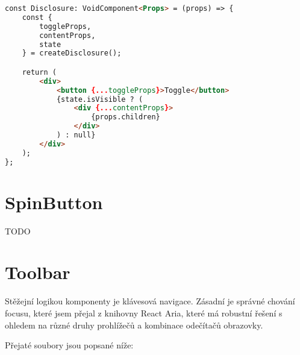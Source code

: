 \clearpage

\begin{lstlisting}[caption={Ukázka implementace Disclosure komponenty}, label={disclosure-example}, language=html]
const Disclosure: VoidComponent<Props> = (props) => {
    const {
        toggleProps,
        contentProps,
        state
    } = createDisclosure();

    return (
        <div>
            <button {...toggleProps}>Toggle</button>
            {state.isVisible ? (
                <div {...contentProps}>
                    {props.children}
                </div>
            ) : null}
        </div>
    );
};
\end{lstlisting}

\section{SpinButton}

TODO

\clearpage

\section{Toolbar}

Stěžejní logikou komponenty  je klávesová navigace.
Zásadní je správné chování focusu, které jsem přejal z knihovny React Aria, které má robustní řešení s ohledem na různé druhy prohlížečů a kombinace odečítačů obrazovky.

Přejaté soubory jsou popsané níže:

